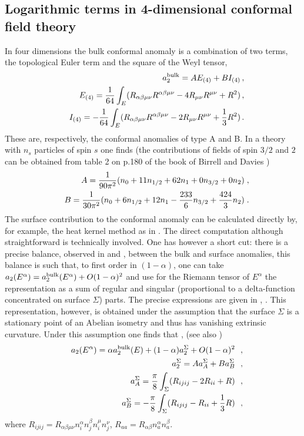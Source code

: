 \documentclass[12pt]{article}
\def\be{\begin{eqnarray}}
\def\ee{\end{eqnarray}}
\def\lb{\label}
\def\o{\over}
\begin{document}
\subsection{Logarithmic terms in 4-dimensional conformal field theory}

In four dimensions the bulk conformal anomaly is a combination of two
terms, the topological Euler term and the square of the
Weyl tensor, \be &&a^{\rm bulk}_2=A E_{(4)}+B I_{(4)}\, ,\nonumber \\
&&E_{(4)}={1\over 64}
\int_E(R_{\alpha\beta\mu\nu}R^{\alpha\beta\mu\nu}-4R_{\mu\nu}R^{\mu\nu}+R^2)\, ,
\nonumber \\ &&I_{(4)}=-{1\over
64}\int_E(R_{\alpha\beta\mu\nu}R^{\alpha\beta\mu\nu}-2R_{\mu\nu}R^{\mu\nu}+{1\over
3} R^2)\, . \lb{d=4 conformal anomaly} 
\ee 
These are, respectively, the conformal
anomalies of type A and B. 
In a theory with $n_s$ particles of spin $s$ one finds \cite{Duff:1993wm} (the contributions of fields of spin $3/2$ and $2$ can be obtained from table 2 on p.180 of the book of Birrell and Davies \cite{Birrell-Davies})
\be
&&A={1\o 90\pi^2}(n_0+11n_{1/2}+62n_1+0n_{3/2}+0n_2)\; , \nonumber \\
&&B={1\o
30\pi^2} (n_0 + 6n_{1/2} + 12n_1-{233\o 6}n_{3/2}+{424\o 3} n_2)\; .
\lb{A and B}
\ee
The surface contribution to the
conformal anomaly can be calculated directly by, for example, the
heat kernel method as in \cite{Fursaev:1994in}. The direct
computation although straightforward is technically involved. One
has however a short cut: there is a precise balance, observed in
\cite{Solodukhin:1994yz} and \cite{Fursaev:1994ea}, between the
bulk and surface anomalies, this balance is such that, to first
order in $(1-\alpha)$, one can take $a_2(E^\alpha)=a_2^{\rm
bulk}(E^\alpha)+O(1-\alpha)^2$ and use for the Riemann tensor of
$E^\alpha$ the representation as a sum of regular and singular
(proportional to a delta-function concentrated on surface
$\Sigma$) parts. The precise expressions are given in
\cite{Fursaev:1994ea}, \cite{Fursaev:1995ef}. This representation,
however, is obtained under the assumption that the surface
$\Sigma$ is a stationary point of an Abelian isometry and thus has  vanishing extrinsic curvature. Under this
assumption one finds that \cite{Fursaev:1994ea},
\cite{Fursaev:1995ef}  (see also \cite{Ryu:2006ef})
\be &&a_2(E^\alpha)=\alpha a^{\rm bulk}
_2(E)+(1-\alpha)
a_2^\Sigma +O(1-\alpha)^2~~,\nonumber \\
&&a_2^\Sigma=A a_A^\Sigma+B a_B^\Sigma ~~,\nonumber \\
 &&a_A^\Sigma={\pi\over 8}\int_\Sigma
(R_{ijij}-2R_{ii}+R) ~~,\nonumber \\
&&a_B^\Sigma= -{\pi\over 8}\int_\Sigma (R_{ijij}-R_{ii}+{1\over
3}R)~~, \lb{d=4 surface anomaly} \ee
where $R_{ijij}=R_{\alpha\beta\mu\nu}n^\alpha_i n^\beta_j n^\mu_i n^\nu_j$,
$R_{aa}=R_{\alpha\beta}n^\alpha_a n^\beta_a$.
\end{document}
